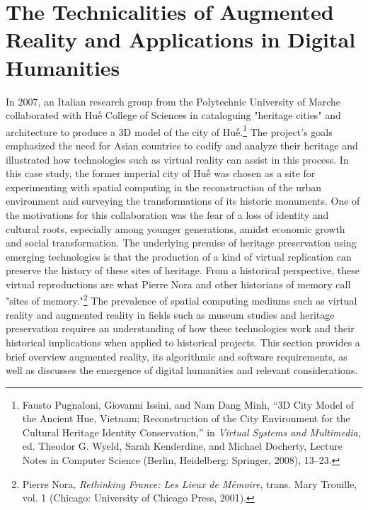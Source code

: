 \chapter[Technicalities of AR and Applications]{The Technicalities of Augmented Reality and Applications in Digital Humanities}\label{text}
\vi
In 2007, an Italian research group from the Polytechnic University of Marche collaborated with Huế College of Sciences in cataloguing "heritage cities" and architecture to produce a 3D model of the city of Huế.\footnote{Fausto Pugnaloni, Giovanni Issini, and Nam Dang Minh, “3D City Model of the Ancient Hue, Vietnam; Reconstruction of the City Environment for the Cultural Heritage Identity Conservation,” in \textit{Virtual Systems and Multimedia}, ed. Theodor G. Wyeld, Sarah Kenderdine, and Michael Docherty, Lecture Notes in Computer Science (Berlin, Heidelberg: Springer, 2008), 13–23.} The project's goals emphasized the need for Asian countries to codify and analyze their heritage and illustrated how technologies such as virtual reality can assist in this process. In this case study, the former imperial city of Huế was chosen as a site for experimenting with spatial computing in the reconstruction of the urban environment and surveying the transformations of its historic monuments. One of the motivations for this collaboration was the fear of a loss of identity and cultural roots, especially among younger generations, amidst economic growth and social transformation. The underlying premise of heritage preservation using emerging technologies is that the production of a kind of virtual replication can preserve the history of these sites of heritage. From a historical perspective, these virtual reproductions are what Pierre Nora and other historians of memory call "sites of memory."\footnote{Pierre Nora, \textit{Rethinking France: Les Lieux de Mémoire}, trans. Mary Trouille, vol. 1 (Chicago: University of Chicago Press, 2001).} The prevalence of spatial computing mediums such as virtual reality and augmented reality in fields such as museum studies and heritage preservation requires an understanding of how these technologies work and their historical implications when applied to historical projects. This section provides a brief overview augmented reality, its algorithmic and software requirements, as well as discusses the emergence of digital humanities and relevant considerations.

